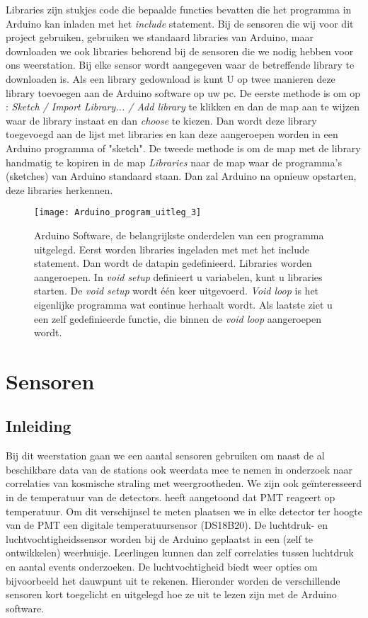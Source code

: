 Libraries zijn stukjes code die bepaalde functies bevatten die het
programma in Arduino kan inladen met het \emph{include} statement. Bij
de sensoren die wij voor dit project gebruiken, gebruiken we standaard
libraries van Arduino, maar downloaden we ook libraries behorend bij de
sensoren die we nodig hebben voor ons weerstation. Bij elke sensor wordt
aangegeven waar de betreffende library te downloaden is. Als een library
gedownload is kunt U op twee manieren deze library toevoegen aan de
Arduino software op uw pc. De eerste methode is om op : \emph{Sketch /
Import Library... / Add library} te klikken en dan de map aan te wijzen
waar de library instaat en dan \emph{choose} te kiezen. Dan wordt deze
library toegevoegd aan de lijst met libraries en kan deze aangeroepen
worden in een Arduino programma of "sketch". De tweede methode is om de
map met de library handmatig te kopiren in de map \emph{Libraries}
naar de map waar de programma's (sketches) van Arduino standaard staan.
Dan zal Arduino na opnieuw opstarten, deze libraries herkennen. 


\begin{figure}
    \centering
    \texttt{[image: Arduino\_program\_uitleg\_3]}
    \caption{Arduino Software, de belangrijkste onderdelen van een 
    programma uitgelegd. Eerst worden libraries ingeladen met 
    met het include statement. Dan wordt de datapin gedefinieerd.
    Libraries worden aangeroepen. In \emph{void setup} definieert u variabelen, 
    kunt u libraries starten. De \emph{void setup} wordt één keer uitgevoerd. 
    \emph{Void loop} is het eigenlijke programma wat continue herhaalt wordt. 
    Als laatste ziet u een zelf gedefinieerde functie, die binnen 
    de \emph{void loop} aangeroepen wordt.}
   \label{fig:Arduino_program_uitleg_3}
\end{figure}


\section{Sensoren}

\subsection{Inleiding}

Bij dit weerstation gaan we een aantal sensoren gebruiken om naast de al
beschikbare data van de \hisparc stations ook weerdata mee te nemen in
onderzoek naar correlaties van kosmische straling met weergrootheden. We
zijn ook ge\"{i}nteresseerd in de temperatuur van de detectors.
\cite{Buisman} heeft aangetoond dat PMT reageert op temperatuur. Om dit
verschijnsel te meten plaatsen we in elke detector ter hoogte van de PMT
een digitale temperatuursensor (DS18B20). De luchtdruk- en
luchtvochtigheidssensor worden bij de Arduino geplaatst in een (zelf te
ontwikkelen) weerhuisje. Leerlingen kunnen dan zelf correlaties tussen
luchtdruk en aantal events onderzoeken. De luchtvochtigheid biedt weer
opties om bijvoorbeeld het dauwpunt uit te rekenen. Hieronder worden de
verschillende sensoren kort toegelicht en uitgelegd hoe ze uit te lezen
zijn met de Arduino software. 


